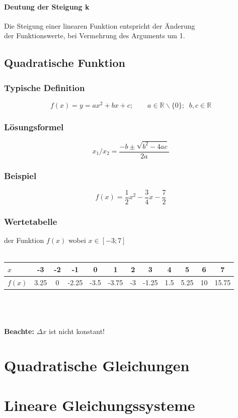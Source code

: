 \documentclass[12pt,a4paper]{scrbook}
\begin{document}
\subsubsection{Deutung der Steigung k}
Die Steigung einer linearen Funktion entspricht der Änderung\\
der Funktionswerte, bei Vermehrung des Arguments um 1.

\section{Quadratische Funktion}
\subsection{Typische Definition}
\[f(x) = y = ax^2 + bx + c; \quad\quad a \in \mathbb{R}\backslash\{0\}; \;\; b, c \in \mathbb{R}\]
\subsection{Lösungsformel}
\[x_1 / x_2 = \frac{-b \pm \sqrt{b^2-4ac}}{2a} \]
\subsection{Beispiel}
\[f(x) = \frac{1}{2}x^2 - \frac{3}{4}x - \frac{7}{2}\]

\subsection{Wertetabelle} der Funktion $f(x)$ wobei $x \in [-3; 7]$\\\\
\begin{tabular}{l||c|c|c|c|c|c|c|c|c|c|c}
$x$ & -3 & -2 & -1 & 0 & 1 & 2 & 3 & 4 & 5 & 6 & 7\\
\hline
$f(x)$ & 3.25 & 0 & -2.25 & -3.5 & -3.75 & -3 & -1.25 & 1.5 & 5.25 & 10 & 15.75\\
\end{tabular}\\\\\\
\textbf{Beachte:} $\Delta x$ ist nicht konstant!\\


\chapter{Quadratische Gleichungen}
\label{quadratische_gleichungen}


\chapter{Lineare Gleichungssysteme}
\end{document}

